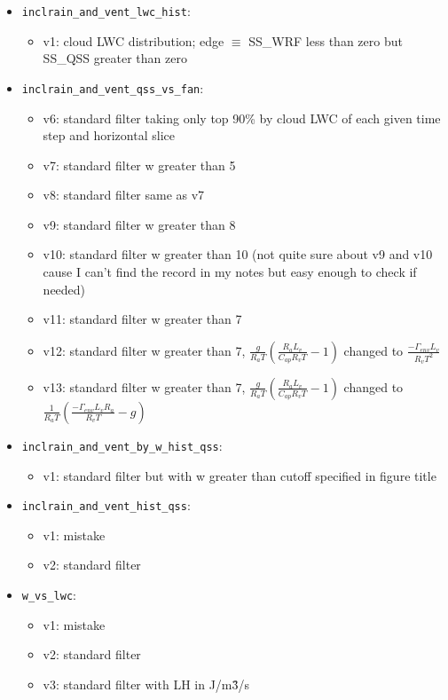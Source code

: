 \documentclass{article}
\begin{document}
\begin{itemize}
\begin{itemize}
		\item \texttt{inclrain\_and\_vent\_lwc\_hist}:
		\begin{itemize}
			\item v1: cloud LWC distribution; edge $\equiv$ SS\_WRF less than zero but SS\_QSS greater than zero
		\end{itemize}
		\item \texttt{inclrain\_and\_vent\_qss\_vs\_fan}:
		\begin{itemize}
			\item v6: standard filter taking only top 90\% by cloud LWC of each given time step and horizontal slice
			\item v7: standard filter w greater than 5
			\item v8: standard filter same as v7
			\item v9: standard filter w greater than 8
			\item v10: standard filter w greater than 10 (not quite sure about v9 and v10 cause I can't find the record in my notes but easy enough to check if needed)
			\item v11: standard filter w greater than 7
			\item v12: standard filter w greater than 7, $\frac{g}{R_a T}(\frac{R_aL_v}{C_{ap}R_vT} - 1)$ changed to $\frac{-\Gamma_{env}L_v}{R_v T^2}$
			\item v13: standard filter w greater than 7, $\frac{g}{R_a T}(\frac{R_aL_v}{C_{ap}R_vT} - 1)$ changed to $\frac{1}{R_aT}(\frac{-\Gamma_{env}L_vR_a}{R_v T}-g)$
		\end{itemize}
		\item \texttt{inclrain\_and\_vent\_by\_w\_hist\_qss}:
		\begin{itemize}
			\item v1: standard filter but with w greater than cutoff specified in figure title
		\end{itemize}
		\item \texttt{inclrain\_and\_vent\_hist\_qss}:
		\begin{itemize}
			\item v1: mistake
			\item v2: standard filter
		\end{itemize}
		\item \texttt{w\_vs\_lwc}:
		\begin{itemize}
			\item v1: mistake
			\item v2: standard filter
			\item v3: standard filter with LH in J/m\^3/s

\end{itemize}
\end{itemize}
\end{itemize}
\end{document}
